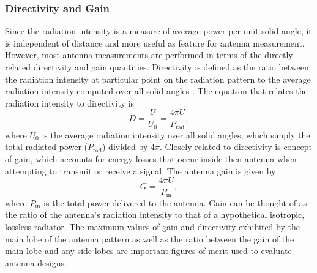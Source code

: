 \subsubsection{Directivity and Gain}
Since the radiation intensity is a measure of average power per unit solid angle, it is independent of distance and more useful as feature for antenna measurement. However, most antenna measurements are performed in terms of the directly related directivity and gain quantities. Directivity is defined as the ratio between the radiation intensity at particular point on the radiation pattern to the average radiation intensity computed over all solid angles \cite{balanis2015antenna}.
The equation that relates the radiation intensity to directivity is
\begin{equation}
    D = \frac{U}{U_0}=\frac{4\pi U}{P_\textrm{rad}},
\end{equation}
where $U_0$ is the average radiation intensity over all solid angles, which simply the total radiated power ($P_\textrm{rad}$) divided by $4\pi$. Closely related to directivity is concept of gain, which accounts for energy losses that occur inside then antenna when attempting to transmit or receive a signal. The antenna gain is given by 
\begin{equation}
    G=\frac{4\pi U}{P_\mathrm{in}},
\end{equation}
where $P_\mathrm{in}$ is the total power delivered to the antenna. Gain can be thought of as the ratio of the antenna's radiation intensity to that of a hypothetical isotropic, lossless radiator. The maximum values of gain and directivity exhibited by the main lobe of the antenna pattern as well as the ratio between the gain of the main lobe and any side-lobes are important figures of merit used to evaluate antenna designs. 

